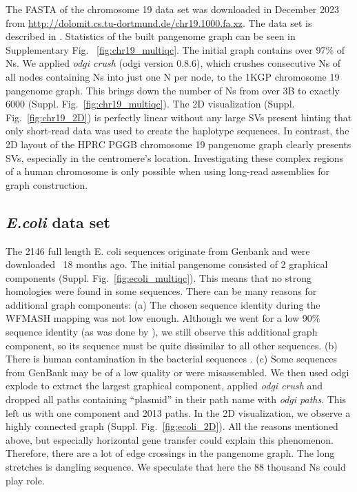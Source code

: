 \documentclass{bioinfo}
\theoremstyle{definition}
\begin{document}
	The FASTA of the chromosome 19 data set was downloaded in December 2023 from \href{http://dolomit.cs.tu-dortmund.de/chr19.1000.fa.xz}{http://dolomit.cs.tu-dortmund.de/chr19.1000.fa.xz}. The data set is described in \citep{Kuhnle2020}. Statistics of the built pangenome graph can be seen in Supplementary Fig. ~\ref{fig:chr19_multiqc}. The initial graph contains over 97\% of Ns. We applied \textit{odgi crush} (odgi version 0.8.6), which crushes consecutive Ns of all nodes containing Ns into just one N per node, to the 1KGP chromosome 19 pangenome graph. This brings down the number of Ns from over 3B to exactly 6000 (Suppl. Fig.~\ref{fig:chr19_multiqc}). 
	The 2D visualization (Suppl. Fig.~\ref{fig:chr19_2D}) is perfectly linear without any large SVs present hinting that only short-read data was used to create the haplotype sequences.
	In contrast, the 2D layout of the HPRC PGGB chromosome 19 pangenome graph \citep{Heumos2024} clearly presents SVs, especially in the centromere's location. Investigating these complex regions of a human chromosome is only possible when using long-read assemblies for graph construction.
	
	
	
	
	\subsection{\textit{E.coli} data set}
	
	The 2146 full length E. coli sequences originate from Genbank \citep{Sayers2021} and were downloaded ~18 months ago. The initial pangenome consisted of 2 graphical components (Suppl. Fig.~\ref{fig:ecoli_multiqc}). This means that no strong homologies were found in some sequences. There can be many reasons for additional graph components: (a) The chosen sequence identity during the WFMASH mapping was not low enough. Although we went for a low 90\% sequence identity (as was done by \cite{Garrison2023}), we still observe this additional graph component, so its sequence must be quite dissimilar to all other sequences. (b) There is human contamination in the bacterial sequences \citep{Breitwieser2019}. (c) Some sequences from GenBank may be of a low quality or were misassembled. We then used odgi explode to extract the largest graphical component, applied \textit{odgi crush} and dropped all paths containing “plasmid” in their path name with \textit{odgi paths}. This left us with one component and 2013 paths.
	In the 2D visualization, we observe a highly connected graph (Suppl. Fig.~\ref{fig:ecoli_2D}). All the reasons mentioned above, but especially horizontal gene transfer could explain this phenomenon. Therefore, there are a lot of edge crossings in the pangenome graph. The long stretches is dangling sequence. We speculate that here the 88 thousand Ns could play role.
	
	
	
	
\end{document}
